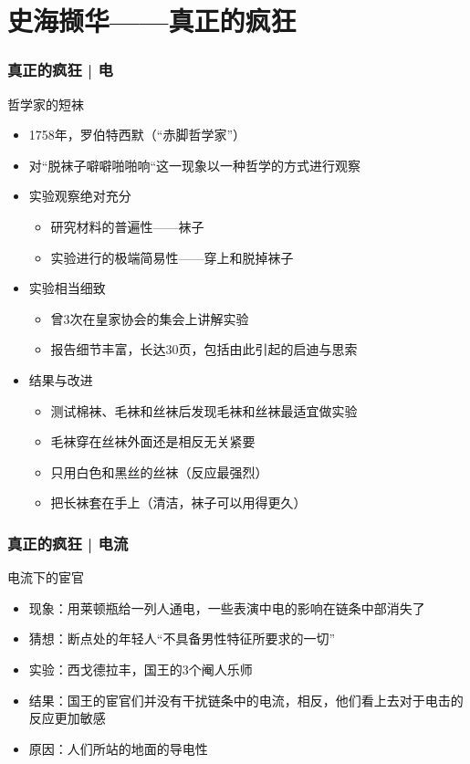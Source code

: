 \section{史海撷华——真正的疯狂}
\begin{frame}
  \frametitle{真正的疯狂 | 电}
  \begin{block}{哲学家的短袜}
    \begin{itemize}
      \item 1758年，罗伯特\textbullet 西默（“赤脚哲学家”）
      \item 对“脱袜子噼噼啪啪响“这一现象以一种哲学的方式进行观察
      \pause
      \item 实验观察绝对充分
        \begin{itemize}
          \item 研究材料的普遍性——袜子
          \item 实验进行的极端简易性——穿上和脱掉袜子
        \end{itemize}
      \item 实验相当细致
        \begin{itemize}
          \item 曾3次在皇家协会的集会上讲解实验
          \item 报告细节丰富，长达30页，包括由此引起的启迪与思索
        \end{itemize}
      \item 结果与改进
        \begin{itemize}
          \item 测试棉袜、毛袜和丝袜后发现毛袜和丝袜最适宜做实验
          \item 毛袜穿在丝袜外面还是相反无关紧要
          \item 只用白色和黑丝的丝袜（反应最强烈）
          \item 把长袜套在手上（清洁，袜子可以用得更久）
        \end{itemize}
    \end{itemize}
  \end{block}
\end{frame}

\begin{frame}
  \frametitle{真正的疯狂 | 电流}
  \begin{block}{电流下的宦官}
    \begin{itemize}
      \item 现象：用莱顿瓶给一列人通电，一些表演中电的影响在链条中部消失了
      \pause
      \item 猜想：断点处的年轻人“不具备男性特征所要求的一切”
      \item 实验：西戈\textbullet 德拉丰，国王的3个阉人乐师
      \item 结果：国王的宦官们并没有干扰链条中的电流，相反，他们看上去对于电击的反应更加敏感
      \item 原因：人们所站的地面的导电性
    \end{itemize}
  \end{block}
\end{frame}

